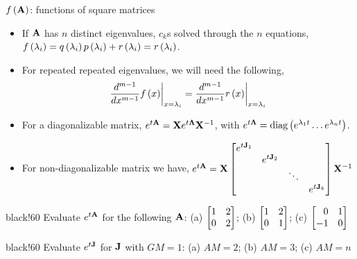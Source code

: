 \documentclass[aspectratio=169]{beamer}
\def\mf{\ensuremath\mathbf}
\def\lp{\ensuremath\left(}
\def\rp{\ensuremath\right)}
\def\bmx{\ensuremath\begin{bmatrix*}[r]}
\def\emx{\ensuremath\end{bmatrix*}}
\def\bmxc{\ensuremath\begin{bmatrix*}[c]}
\newcommand{\demoex}[2]{\onslide<#1->\begin{color}{black!60} #2 \end{color}}
\begin{document}
\begin{frame}{$f\lp\mf{A}\rp$: functions of square matrices}
\begin{small}
\begin{itemize}
    \item If $\mf{A}$ has $n$ distinct eigenvalues, $c_k$s solved through the $n$ equations, $f\lp \lambda_i\rp = q\lp\lambda_i\rp p\lp\lambda_i\rp + r\lp \lambda_i\rp = r\lp \lambda_i\rp$.

    \item For repeated repeated eigenvalues, we will need the following,
    \[ \frac{d^{m-1}}{dx^{m-1}}f\lp x\rp\biggr\rvert_{x=\lambda_i} = \frac{d^{m-1}}{dx^{m-1}}r\lp x\rp\biggr\rvert_{x=\lambda_i} \]
    
    \item For a diagonalizable matrix, $e^{t\mf{A}} = \mf{X}e^{t\mf{\Lambda}}\mf{X}^{-1}$, with $e^{t\mf{\Lambda}} = \text{diag}\lp e^{\lambda_1t} \ldots e^{\lambda_nt}\rp$.

    \item For non-diagonalizable matrix we have,
    $e^{t\mf{A}} = \mf{X}\bmxc e^{t\mf{J}_1} &  &  &\\
          & e^{t\mf{J}_2} &  &\\
          & & \ddots &\\
          &  &  & e^{t\mf{J}_k}\emx\mf{X}^{-1}$
\end{itemize}
\demoex{2}{Evaluate $e^{t\mf{A}}$ for the following $\mf{A}$: (a) $\bmx 1 & 2 \\ 0 & 2\emx$; (b) $\bmx 1 & 2 \\ 0 & 1\emx$; (c) $\bmx 0 & 1\\ -1 & 0\emx$}

\demoex{3}{Evaluate $e^{t\mf{J}}$ for $\mf{J}$ with $GM=1$: (a) $AM=2$; (b) $AM=3$; (c) $AM=n$}

\end{small}
\end{frame}
\end{document}
